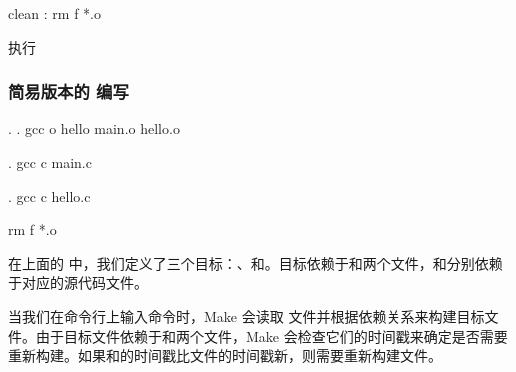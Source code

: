 \documentclass[a4paper,12pt,english]{sphinxmanual}
\begin{document}
\begin{sphinxVerbatim}[commandchars=\\\{\}]
clean :
rm \PYGZhy{}f \PYGZbs{}*.o

\end{sphinxVerbatim}

\sphinxAtStartPar
{}执行


\subsubsection{简易版本的  编写}
\label{\detokenize{dev-board/clion:id8}}
\begin{sphinxVerbatim}[commandchars=\\\{\}]

 . .
        gcc \PYGZhy{}o hello main.o hello.o

 .
        gcc \PYGZhy{}c main.c

 .
        gcc \PYGZhy{}c hello.c

    rm \PYGZhy{}f *.o
\end{sphinxVerbatim}

\sphinxAtStartPar
在上面的  中，我们定义了三个目标：、和。目标依赖于和两个文件，和分别依赖于对应的源代码文件。

\sphinxAtStartPar
当我们在命令行上输入命令时，Make 会读取  文件并根据依赖关系来构建目标文件。由于目标文件依赖于和两个文件，Make 会检查它们的时间戳来确定是否需要重新构建。如果和的时间戳比文件的时间戳新，则需要重新构建文件。
\end{document}
